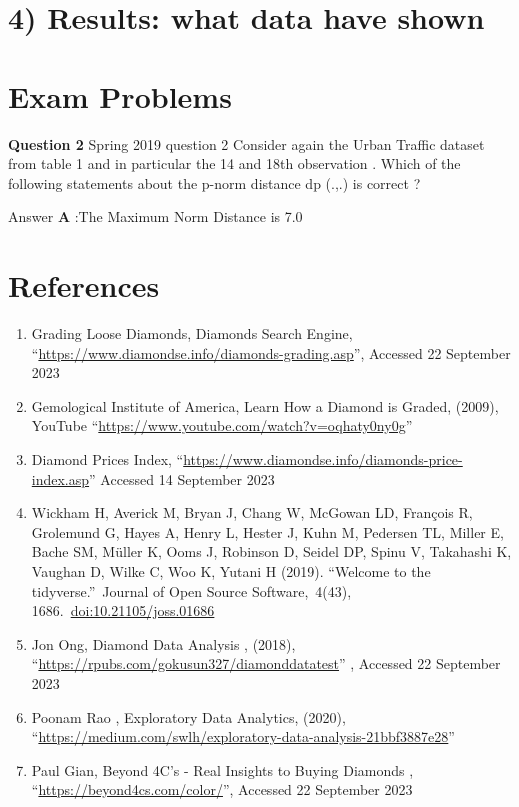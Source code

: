 \documentclass[
]{article}
\begin{document}
\section{4) Results: what data have
shown}\label{results-what-data-have-shown}

\section{Exam Problems}\label{exam-problems}

\textbf{Question 2} \textbar{} Spring 2019 question 2 Consider again the
Urban Traffic dataset from table 1 and in particular the 14 and 18th
observation . Which of the following statements about the p-norm
distance dp (.,.) is correct ?

Answer \textbf{A} :The Maximum Norm Distance is 7.0

\section{References}\label{references}

\begin{enumerate}
\def\labelenumi{\arabic{enumi})}
\item
  Grading Loose Diamonds, Diamonds Search Engine,
  ``\url{https://www.diamondse.info/diamonds-grading.asp}'', Accessed 22
  September 2023
\item
  Gemological Institute of America, Learn How a Diamond is Graded,
  (2009), YouTube ``\url{https://www.youtube.com/watch?v=oqhaty0ny0g}''
\item
  Diamond Prices Index,
  ``\url{https://www.diamondse.info/diamonds-price-index.asp}'' Accessed
  14 September 2023
\item
  Wickham H, Averick M, Bryan J, Chang W, McGowan LD, François R,
  Grolemund G, Hayes A, Henry L, Hester J, Kuhn M, Pedersen TL, Miller
  E, Bache SM, Müller K, Ooms J, Robinson D, Seidel DP, Spinu V,
  Takahashi K, Vaughan D, Wilke C, Woo K, Yutani H (2019). ``Welcome to
  the tidyverse.''~Journal of Open Source Software,~4(43),
  1686.~\url{doi:10.21105/joss.01686}
\item
  Jon Ong, Diamond Data Analysis , (2018),
  ``\url{https://rpubs.com/gokusun327/diamonddatatest}'' , Accessed 22
  September 2023
\item
  Poonam Rao , Exploratory Data Analytics, (2020),
  ``\url{https://medium.com/swlh/exploratory-data-analysis-21bbf3887e28}''
\item
  Paul Gian, Beyond 4C's - Real Insights to Buying Diamonds ,
  ``\url{https://beyond4cs.com/color/}'', Accessed 22 September 2023
\end{enumerate}
\end{document}

